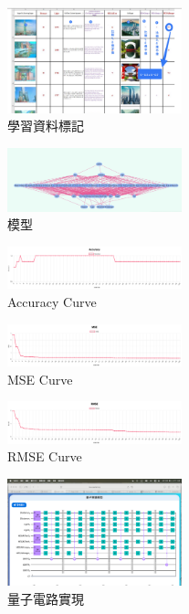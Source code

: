 \documentclass[twocolumn,11pt,a4paper]{article}
\begin{document}
\begin{figure}[htbp]
    \centering
    \includegraphics[width=0.45\textwidth]{res/image/labeling_train_data.png}
    \caption{學習資料標記}
    \label{fig:labeling_dataset}
\end{figure}
\begin{figure}[htbp]
    \centering
    \includegraphics[width=0.45\textwidth]{res/image/model.png}
    \caption{模型}
    \label{fig:model}
\end{figure}

\begin{figure}[htbp]
    \centering
    \includegraphics[width=0.45\textwidth]{res/image/accuracy.png}
    \caption{Accuracy Curve}
    \label{fig:accuracy_curve}
\end{figure}
\begin{figure}[htbp]
    \centering
    \includegraphics[width=0.45\textwidth]{res/image/mse.png}
    \caption{MSE Curve}
    \label{fig:mse_curve}
\end{figure}
\begin{figure}[htbp]
    \centering
    \includegraphics[width=0.45\textwidth]{res/image/rmse.png}
    \caption{RMSE Curve}
    \label{fig:rmse_curve}
\end{figure}
\begin{figure}[htbp]
    \centering
    \includegraphics[width=0.45\textwidth]{res/image/quantum.png}
    \caption{量子電路實現}
    \label{fig:quantum_circuit}
\end{figure}
\end{document}
